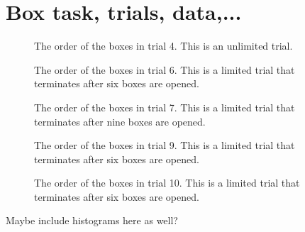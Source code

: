 \appendix
\chapter{Box task, trials, data,...}

\begin{figure}
    \centering
    \scalebox{0.8}{}
    \caption[Order of boxes in trial 4]{The order of the boxes in trial 4. This is an unlimited trial.}
    \label{fig:trial4_order}
\end{figure}

\begin{figure}
    \centering
    \scalebox{0.8}{}
    \caption[Order of boxes in trial 6]{The order of the boxes in trial 6. This is a limited trial that terminates after six boxes are opened.}
    \label{fig:trial6_order}
\end{figure}

\begin{figure}
    \centering
    \scalebox{0.8}{}
    \caption[Order of boxes in trial 7]{The order of the boxes in trial 7. This is a limited trial that terminates after nine boxes are opened.}
    \label{fig:trial7_order}
\end{figure}

\begin{figure}
    \centering
    \scalebox{0.8}{}
    \caption[Order of boxes in trial 9]{The order of the boxes in trial 9. This is a limited trial that terminates after six boxes are opened.}
    \label{fig:trial9_order}
\end{figure}

\begin{figure}
    \centering
    \scalebox{0.8}{}
    \caption[Order of boxes in trial 10]{The order of the boxes in trial 10. This is a limited trial that terminates after six boxes are opened.}
    \label{fig:trial10_order}
\end{figure}

Maybe include histograms here as well?
